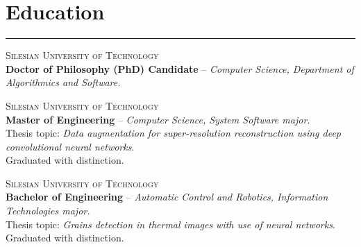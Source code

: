 \documentclass{article}
\begin{document}
\section*{Education}

\hrule \medskip

\noindent
\textsc{Silesian University of Technology} \\
\textbf{Doctor of Philosophy (PhD) Candidate} -- \textit{Computer Science, Department of Algorithmics and Software.}

\medskip
{}
\noindent
\textsc{Silesian University of Technology} \\
\textbf{Master of Engineering} -- \textit{Computer Science, System Software major.} \\
Thesis topic: \textit{Data augmentation for super-resolution reconstruction using deep convolutional neural networks}. \\
Graduated with distinction.

\medskip
{}
\noindent
\textsc{Silesian University of Technology} \\
\textbf{Bachelor of Engineering} -- \textit{Automatic Control and Robotics, Information Technologies major.} \\
Thesis topic: \textit{Grains detection in thermal images with use of neural networks}. \\
Graduated with distinction.

\end{document}
